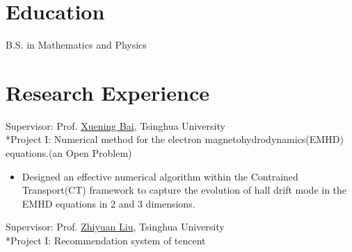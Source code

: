 \documentclass{resume}
\begin{document}



\section{Education}
B.S. in Mathematics and Physics

\section{Research Experience}
Supervisor: Prof. \href{http://astro.tsinghua.edu.cn/~xbai/}{Xuening Bai}, Tsinghua University
\\*Project I: Numerical method for the electron magnetohydrodynamics(EMHD) equations.(an Open Problem)
\begin{itemize}
    \item Designed an effective numerical algorithm within the Contrained Transport(CT) framework to capture the evolution of hall drift mode in the EMHD equations in 2 and 3 dimensions.
\end{itemize}

Supervisor: Prof. \href{http://nlp.csai.tsinghua.edu.cn/~lzy/}{Zhiyuan Liu}, Tsinghua University
\\*Project I: Recommendation system of tencent
\end{document}
